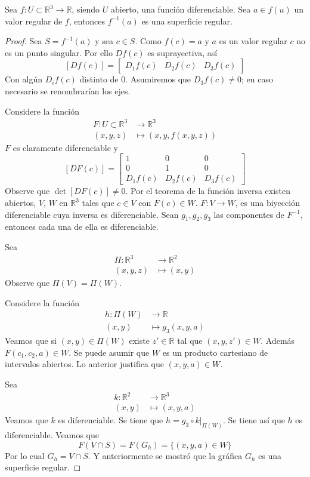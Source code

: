 \begin{proposition}
  Sea $f: U \subset \mathbb{R}^3 \to \mathbb{R}$, siendo $U$ abierto, una
  función diferenciable. Sea $a \in f(u)$ un valor regular de $f$, entonces
  $f^{-1}(a)$ es una superficie regular.  
\end{proposition}
\begin{proof}
  Sea $S = f^{-1}(a)$ y sea $c \in S$. Como $f(c) = a$ y $a$ es un valor regular
  $c$ no es un punto singular. Por ello $Df(c)$ es suprayectiva, así
  \[
    [Df(c)] =%
    \begin{bmatrix}
      D_1f(c) & D_2f(c) & D_3f(c)
    \end{bmatrix}
  \]
  Con algún $D_if(c)$ distinto de 0. Asumiremos que $D_3f(c) \neq 0$; en caso
  necesario se renombrarían los ejes.

  Considere la función
  \begin{align*}
    F: U \subset \mathbb{R}^3 &\to \mathbb{R}^3 \\
    (x,y,z) &\mapsto (x,y, f(x,y,z))
  \end{align*}
  $F$ es claramente diferenciable y
  \[
    [DF(c)] =%
    \begin{bmatrix}
      1 & 0 & 0 \\ 
      0 & 1 & 0 \\ 
      D_1f(c) & D_2f(c) & D_3f(c) 
    \end{bmatrix}
  \]
  Observe que $\det [DF(c)] \neq 0$. Por el teorema de la función inversa
  existen abiertos, $V$, $W$ en $\mathbb{R}^3$ tales que $c \in V$ con $F(c) \in
  W$. $F: V \to W$, es una biyección diferenciable cuya inversa es
  diferenciable. 
Sean $g_1, g_2, g_3$ las componentes de $F^{-1}$, entonces cada una de ella es
diferenciable.

Sea 
\begin{align*}
  \Pi: \mathbb{R}^3 &\to \mathbb{R}^2 \\
  (x,y,z) &\mapsto (x,y)
\end{align*}
Observe que $\Pi(V) = \Pi(W)$.

Considere la función 
\begin{align*}
  h: \Pi(W) &\to \mathbb{R} \\
  (x,y) &\mapsto g_3(x,y,a)
\end{align*}
Veamos que si $(x,y) \in \Pi(W)$ existe $z' \in \mathbb{R}$ tal que $(x,y,z')
\in W$. Además $F(c_1,c_2,a) \in W$. Se puede asumir que $W$ es un producto
cartesiano de intervalos abiertos. Lo anterior justifica que $(x, y, a) \in W$. 

Sea
\begin{align*}
  k: \mathbb{R}^2 &\to \mathbb{R}^3 \\
  (x,y) &\mapsto (x,y,a)
\end{align*}
Veamos que $k$ es diferenciable. Se tiene que $h = g_3 \circ k|_{\Pi(W)}$. Se
tiene así que $h$ es diferenciable. Veamos que
\[
  F(V \cap S) = F(G_h) = \{ (x, y, a) \in W \} 
\]
Por lo cual $G_h = V \cap S$. Y anteriormente se mostró que la gráfica $G_h$ es
una superficie regular.


\end{proof}
